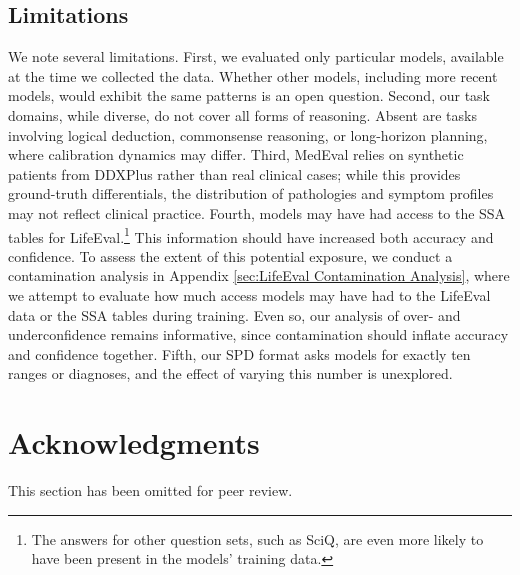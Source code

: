 \documentclass{article}
\begin{document}
\subsection{Limitations}

We note several limitations. First, we evaluated only particular models, available at the time we collected the data. Whether other models, including more recent models, would exhibit the same patterns is an open question. Second, our task domains, while diverse, do not cover all forms of reasoning. Absent are tasks involving logical deduction, commonsense reasoning, or long-horizon planning, where calibration dynamics may differ. Third, MedEval relies on synthetic patients from DDXPlus rather than real clinical cases; while this provides ground-truth differentials, the distribution of pathologies and symptom profiles may not reflect clinical practice. Fourth, models may have had access to the SSA tables for LifeEval.\footnote{The answers for other question sets, such as SciQ, are even more likely to have been present in the models' training data.} This information should have increased both accuracy and confidence. To assess the extent of this potential exposure, we conduct a contamination analysis in Appendix \ref{sec:LifeEval Contamination Analysis}, where we attempt to evaluate how much access models may have had to the LifeEval data or the SSA tables during training. Even so, our analysis of over- and underconfidence remains informative, since contamination should inflate accuracy and confidence together. Fifth, our SPD format asks models for exactly ten ranges or diagnoses, and the effect of varying this number is unexplored.



\section*{Acknowledgments}

This section has been omitted for peer review.

\end{document}
